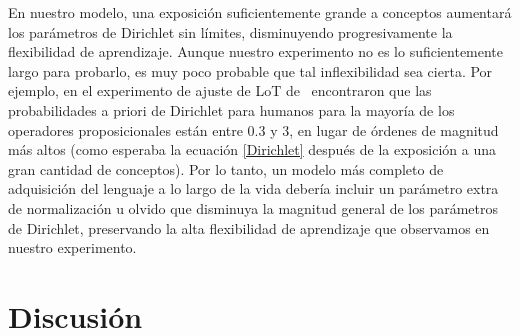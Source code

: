 En nuestro modelo, una exposición suficientemente grande a conceptos aumentará los parámetros de Dirichlet sin límites, disminuyendo progresivamente la flexibilidad de aprendizaje. Aunque nuestro experimento no es lo suficientemente largo para probarlo, es muy poco probable que tal inflexibilidad sea cierta. Por ejemplo, en el experimento de ajuste de LoT de~\cite{piantadosi2016logical} encontraron que las probabilidades a priori de Dirichlet para humanos para la mayoría de los operadores proposicionales están entre 0.3 y 3, en lugar de órdenes de magnitud más altos (como esperaba la ecuación \eqref{Dirichlet} después de la exposición a una gran cantidad de conceptos). Por lo tanto, un modelo más completo de adquisición del lenguaje a lo largo de la vida debería incluir un parámetro extra de normalización u olvido que disminuya la magnitud general de los parámetros de Dirichlet, preservando la alta flexibilidad de aprendizaje que observamos en nuestro experimento.

\section{Discusión}

